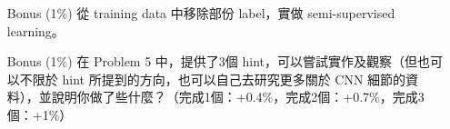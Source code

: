 \documentclass[12pt,a4paper]{extarticle}
\begin{document}
\begin{enumerate}
  \newpage

	\item[Bonus] (1\%) 從 training data 中移除部份 label，實做 semi-supervised learning。

	\item[Bonus] (1\%) 在 Problem 5 中，提供了3個 hint，可以嘗試實作及觀察（但也可以不限於 hint 所提到的方向，也可以自己去研究更多關於 CNN 細節的資料），並說明你做了些什麼？（完成1個：+0.4\%，完成2個：+0.7\%，完成3個：+1\%）

\end{enumerate}
\end{document}
